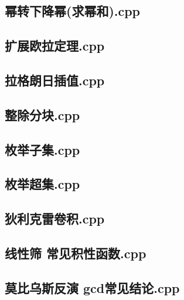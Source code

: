 \subsection{幂转下降幂(求幂和).cpp}


\subsection{扩展欧拉定理.cpp}


\subsection{拉格朗日插值.cpp}


\subsection{整除分块.cpp}


\subsection{枚举子集.cpp}


\subsection{枚举超集.cpp}


\subsection{狄利克雷卷积.cpp}


\subsection{线性筛 常见积性函数.cpp}


\subsection{莫比乌斯反演 gcd常见结论.cpp}


